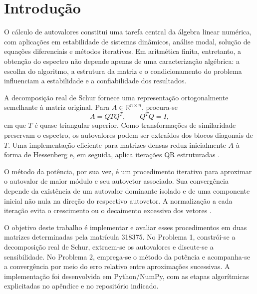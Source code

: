 \section{Introdução}

O cálculo de autovalores constitui uma tarefa central da álgebra linear numérica, com aplicações em estabilidade de sistemas dinâmicos, análise modal, solução de equações diferenciais e métodos iterativos. Em aritmética finita, entretanto, a obtenção do espectro não depende apenas de uma caracterização algébrica: a escolha do algoritmo, a estrutura da matriz e o condicionamento do problema influenciam a estabilidade e a confiabilidade dos resultados.

A decomposição real de Schur fornece uma representação ortogonalmente semelhante à matriz original. Para \(A\in\mathbb{R}^{n\times n}\), procura-se
\[
A=QTQ^T,\qquad Q^TQ=I,
\]
em que \(T\) é quase triangular superior. Como transformações de similaridade preservam o espectro, os autovalores podem ser extraídos dos blocos diagonais de \(T\). Uma implementação eficiente para matrizes densas reduz inicialmente \(A\) à forma de Hessenberg e, em seguida, aplica iterações QR estruturadas \cite{golubvanloan,trefethenbau}.

O método da potência, por sua vez, é um procedimento iterativo para aproximar o autovalor de maior módulo e seu autovetor associado. Sua convergência depende da existência de um autovalor dominante isolado e de uma componente inicial não nula na direção do respectivo autovetor. A normalização a cada iteração evita o crescimento ou o decaimento excessivo dos vetores \cite{saad}.

O objetivo deste trabalho é implementar e avaliar esses procedimentos em duas matrizes determinadas pela matrícula 318375. No Problema 1, constrói-se a decomposição real de Schur, extraem-se os autovalores e discute-se a sensibilidade. No Problema 2, emprega-se o método da potência e acompanha-se a convergência por meio do erro relativo entre aproximações sucessivas. A implementação foi desenvolvida em Python/NumPy, com as etapas algorítmicas explicitadas no apêndice e no repositório indicado.
